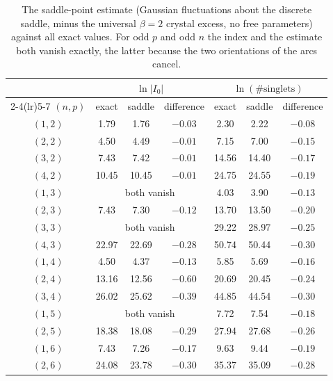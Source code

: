 \documentclass[10pt]{article}
\begin{document}
\begin{table}[t]\centering\small
\begin{tabular}{ccccccc}
\toprule
& \multicolumn{3}{c}{$\ln|I_0|$} & \multicolumn{3}{c}{$\ln(\#\text{singlets})$}\\
\cmidrule(lr){2-4}\cmidrule(lr){5-7}
$(n,p)$ & exact & saddle & difference & exact & saddle & difference\\
\midrule
$(1,2)$ & 1.79 & 1.76 & $-0.03$ & 2.30 & 2.22 & $-0.08$ \\
$(2,2)$ & 4.50 & 4.49 & $-0.01$ & 7.15 & 7.00 & $-0.15$ \\
$(3,2)$ & 7.43 & 7.42 & $-0.01$ & 14.56 & 14.40 & $-0.17$ \\
$(4,2)$ & 10.45 & 10.45 & $-0.01$ & 24.75 & 24.55 & $-0.19$ \\
$(1,3)$ & \multicolumn{3}{c}{both vanish} & 4.03 & 3.90 & $-0.13$ \\
$(2,3)$ & 7.43 & 7.30 & $-0.12$ & 13.70 & 13.50 & $-0.20$ \\
$(3,3)$ & \multicolumn{3}{c}{both vanish} & 29.22 & 28.97 & $-0.25$ \\
$(4,3)$ & 22.97 & 22.69 & $-0.28$ & 50.74 & 50.44 & $-0.30$ \\
$(1,4)$ & 4.50 & 4.37 & $-0.13$ & 5.85 & 5.69 & $-0.16$ \\
$(2,4)$ & 13.16 & 12.56 & $-0.60$ & 20.69 & 20.45 & $-0.24$ \\
$(3,4)$ & 26.02 & 25.62 & $-0.39$ & 44.85 & 44.54 & $-0.30$ \\
$(1,5)$ & \multicolumn{3}{c}{both vanish} & 7.72 & 7.54 & $-0.18$ \\
$(2,5)$ & 18.38 & 18.08 & $-0.29$ & 27.94 & 27.68 & $-0.26$ \\
$(1,6)$ & 7.43 & 7.26 & $-0.17$ & 9.63 & 9.44 & $-0.19$ \\
$(2,6)$ & 24.08 & 23.78 & $-0.30$ & 35.37 & 35.09 & $-0.28$ \\
\bottomrule
\end{tabular}
\caption{The saddle-point estimate (Gaussian fluctuations about the discrete saddle, minus the universal $\beta=2$
crystal excess, no free parameters) against all exact values. For odd $p$ and odd $n$ the index and the estimate
both vanish exactly, the latter because the two orientations of the arcs cancel.}
\label{tab:laplace}
\end{table}
\end{document}
